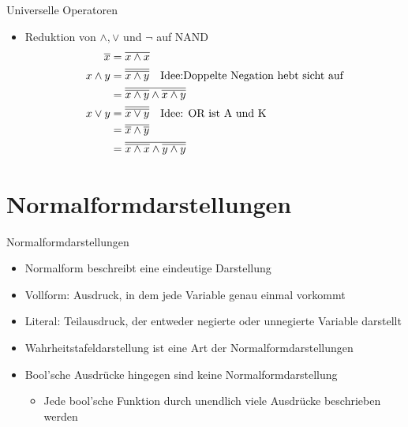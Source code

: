 \documentclass[12pt%
,aspectratio=169%
]{beamer}
\begin{document}
\begin{frame}{Universelle Operatoren}
\begin{itemize}
	\item Reduktion von $\land, \lor$ und $\neg$ auf NAND
	\begin{align*}
		\overline{x} &= \overline{x \land x}\\
		x \land y &= \overline{\overline{x \land y}} \text{\quad Idee:Doppelte Negation hebt sicht auf}\\
		&= \overline{\overline{x \land y} \land \overline{x \land y}}\\
		x \lor y &= \overline{\overline{x \lor y}} \text{\quad Idee: OR ist A und K} \\
		&= \overline{\overline{x} \land \overline{y}}\\
		&= \overline{\overline{x \land x} \land \overline{y \land y}}
	\end{align*}
\end{itemize}
\end{frame}

\section{Normalformdarstellungen}
\begin{frame}{Normalformdarstellungen}
\begin{itemize}
	\item Normalform beschreibt eine eindeutige Darstellung
	\item Vollform: Ausdruck, in dem jede Variable genau einmal vorkommt 
	\item Literal: Teilausdruck, der entweder negierte oder unnegierte Variable darstellt
	\item Wahrheitstafeldarstellung ist eine Art der Normalformdarstellungen
	\item Bool'sche Ausdrücke hingegen sind keine Normalformdarstellung
	\begin{itemize}
		\item Jede bool'sche Funktion durch unendlich viele Ausdrücke beschrieben werden
	\end{itemize}
\end{itemize}
\end{frame}
\end{document}
